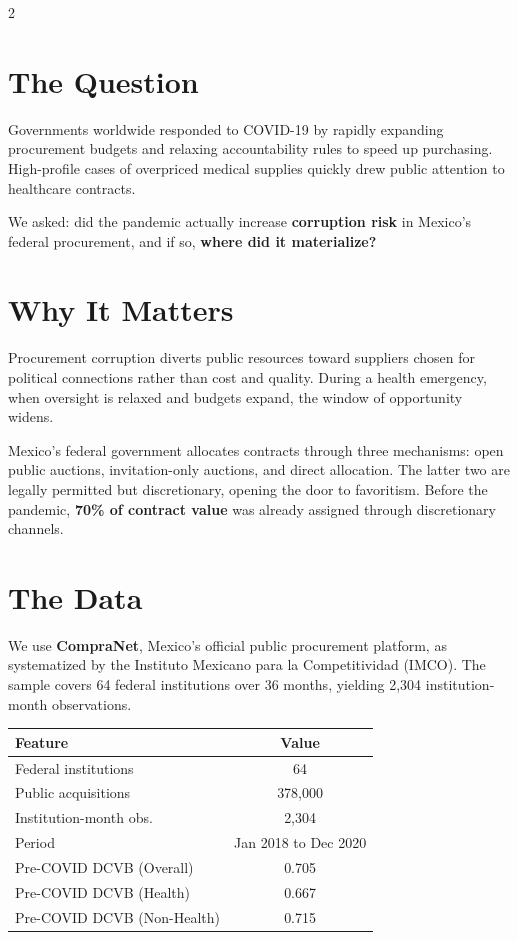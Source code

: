 \documentclass[9pt]{article}
\begin{document}
\begin{multicols}{2}

\section{The Question}

Governments worldwide responded to COVID-19 by rapidly expanding
procurement budgets and relaxing accountability rules to speed up
purchasing. High-profile cases of overpriced medical supplies quickly
drew public attention to healthcare contracts.

We asked: did the pandemic actually increase \textbf{corruption risk}
in Mexico's federal procurement, and if so, \textbf{where did it
materialize?}

\section{Why It Matters}

Procurement corruption diverts public resources toward suppliers
chosen for political connections rather than cost and quality. During
a health emergency, when oversight is relaxed and budgets expand,
the window of opportunity widens.

Mexico's federal government allocates contracts through three
mechanisms: open public auctions, invitation-only auctions, and direct
allocation. The latter two are legally permitted but discretionary,
opening the door to favoritism. Before the pandemic, \textbf{70\% of
contract value} was already assigned through discretionary channels.

\section{The Data}

We use \textbf{CompraNet}, Mexico's official public procurement
platform, as systematized by the Instituto Mexicano para la
Competitividad (IMCO). The sample covers 64 federal institutions over
36 months, yielding 2,304 institution-month observations.

\vspace{0.4em}
{\small\centering
\begin{tabular}{lc}
  \toprule
  \textbf{Feature} & \textbf{Value} \\
  \midrule
  Federal institutions     & 64 \\
  Public acquisitions      & 378,000 \\
  Institution-month obs.   & 2,304 \\
  Period                   & Jan 2018 to Dec 2020 \\
  \midrule
  Pre-COVID DCVB (Overall) & 0.705 \\
  Pre-COVID DCVB (Health)  & 0.667 \\
  Pre-COVID DCVB (Non-Health) & 0.715 \\
  \bottomrule
\end{tabular}\par}


\end{multicols}
\end{document}
